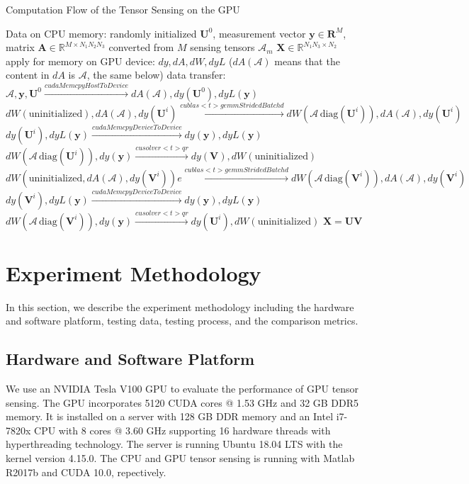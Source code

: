 \documentclass[futureinternet,article,submit,moreauthors,pdftex,10pt,a4paper]{Definitions/mdpi}
\theoremstyle{plain}
\theoremstyle{definition}
\theoremstyle{remark}
\begin{document}
\begin{algorithm}
\caption{Computation Flow of the Tensor Sensing on the GPU}
\label{alg:GPU}
\begin{algorithmic}[1]
    \Require Data on CPU memory: randomly initialized $\mathbf{U}^0$, measurement vector $\mathbf{y} \in \mathbf{R}^M$, matrix $\mathbf{A} \in \mathbb{R}^{M \times N_1N_2N_3}$ converted from $M$ sensing tensors $\mathcal{A}_m$
    \Ensure $\mathbf{X} \in \mathbb{R}^{N_1N_3 \times N_2}$
    \State apply for memory on GPU device: $dy, dA, dW, dyL$ ($dA(\mathcal{A})$ means that the content in $dA$ is $\mathcal{A}$, the same below)
    \State data transfer: $\mathcal{A}, \mathbf{y}, \mathbf{U}^0 \stackrel{cudaMemcpyHostToDevice}{\longrightarrow} dA(\mathcal{A}), dy(\mathbf{U}^0), dyL(\mathbf{y})$ 
        \State $dW(\text{uninitialized}), dA(\mathcal{A}), dy(\mathbf{U}^i) \stackrel{cublas<t>gemmStridedBatchd}{\longrightarrow} dW(\mathcal{A}\, \text{diag}(\mathbf{U}^i)), dA(\mathcal{A}), dy(\mathbf{U}^i)$
        \State  $dy(\mathbf{U}^i), dyL(\mathbf{y}) \stackrel{cudaMemcpyDeviceToDevice}{\longrightarrow} dy(\mathbf{y}), dyL(\mathbf{y})$
        \State $dW(\mathcal{A}\, \text{diag}(\mathbf{U}^i)), dy(\mathbf{y}) \stackrel{cusolver<t>qr}{\longrightarrow} dy(\mathbf{V}), dW(\text{uninitialized})$
        \State $dW(\text{uninitialized}, dA(\mathcal{A}), dy(\mathbf{V}^i))e \stackrel{cublas<t>gemmStridedBatchd}{\longrightarrow} dW(\mathcal{A}\, \text{diag}(\mathbf{V}^i)), dA(\mathcal{A}), dy(\mathbf{V}^i)$
        \State  $dy(\mathbf{V}^i), dyL(\mathbf{y}) \stackrel{cudaMemcpyDeviceToDevice}{\longrightarrow} dy(\mathbf{y}), dyL(\mathbf{y})$
        \State $dW(\mathcal{A}\, \text{diag}(\mathbf{V}^i)), dy(\mathbf{y}) \stackrel{cusolver<t>qr}{\longrightarrow} dy(\mathbf{U}^i), dW(\text{uninitialized})$
    \EndFor
    \State \Return $\mathbf{X} = \mathbf{U}\mathbf{V}$
\end{algorithmic}
\end{algorithm}

\section{Experiment Methodology}
\label{SEC_EXP}
In this section, we describe the experiment methodology including the hardware and software platform, testing data, testing process, and the comparison metrics.

\subsection{Hardware and Software Platform}
We use an NVIDIA Tesla V100 GPU to evaluate the performance of GPU tensor sensing. The GPU incorporates 5120 CUDA cores @ 1.53 GHz and 32 GB DDR5 memory. It is installed on a server with 128 GB DDR memory and an Intel i7-7820x CPU with 8 cores @ 3.60 GHz supporting 16 hardware threads with hyperthreading technology. The server is running Ubuntu 18.04 LTS with the kernel version 4.15.0. The CPU and GPU tensor sensing is running with Matlab R2017b and  CUDA 10.0, repectively.
\end{document}
